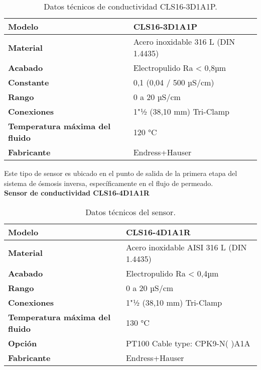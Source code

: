 \renewcommand{\arraystretch}{2}
\begin{table}[H]
    \centering
    \caption{Datos técnicos de conductividad CLS16-3D1A1P.}
    \label{table:sensorCLS16}
    \begin{tabular}{| L{5cm} | L{5cm} |}
        \hline
        \textbf{Modelo} & CLS16-3D1A1P  \\
        \hline
        \textbf{Material} & Acero inoxidable 316 L (DIN 1.4435)  \\
        \hline
        \textbf{Acabado} & Electropulido Ra < 0,8µm  \\
        \hline
        \textbf{Constante} & 0,1 (0,04 / 500 µS/cm)  \\
        \hline
        \textbf{Rango} & 0 a 20 µS/cm  \\
        \hline
        \textbf{Conexiones} & 1"½ (38,10 mm) Tri-Clamp  \\
        \hline
        \textbf{Temperatura máxima del fluido} & 120 °C  \\
        \hline
        \textbf{Fabricante} & Endress+Hauser  \\
        \hline
    \end{tabular}
\end{table}

Este tipo de sensor es ubicado en el punto de salida de la primera etapa del sistema de ósmosis inversa, específicamente en el flujo de permeado.\\


\textbf{Sensor de conductividad CLS16-4D1A1R}



\begin{table}[H]
    \centering
    \caption{Datos técnicos del sensor.}
    \label{table:sensor_2}
    \begin{tabular}{| L{5cm} | L{5cm} |}
        \hline
        \textbf{Modelo} & CLS16-4D1A1R  \\
        \hline
        \textbf{Material} & Acero inoxidable AISI 316 L (DIN 1.4435)  \\
        \hline
        \textbf{Acabado} & Electropulido Ra < 0,4µm  \\
        \hline
        \textbf{Rango} & 0 a 20 µS/cm  \\
        \hline
        \textbf{Conexiones} & 1"½ (38,10 mm) Tri-Clamp  \\
        \hline
        \textbf{Temperatura máxima del fluido} & 130 °C  \\
        \hline
        \textbf{Opción} & PT100 Cable type: CPK9-N( )A1A  \\
        \hline
        \textbf{Fabricante} & Endress+Hauser  \\
        \hline
    \end{tabular}
\end{table}


